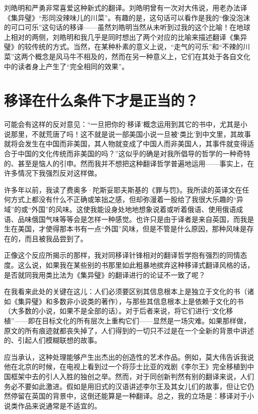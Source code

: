 刘皓明和严勇非常喜爱这种新式的翻译。刘皓明曾有一次对大伟说，用老办法译《集异璧》“形同没辣味儿的川菜”。有趣的是，这句话可以看作是我的“像没泡沫的可口可乐”这句话的移译——虽然刘皓明当然从未听到过我的这个比喻！在地球上相对的两侧，刘皓明和我几乎是同时想出了两个对应的比喻来描述翻译《集异璧》的较传统的方式。当然，在某种朴素的意义上说，“走气的可乐”和“不辣的川菜”这两个概念是风马牛不相及的，然而在另一种意义上，它们在其处于各自文化中的读者身上产生了“完全相同的效果”。

\section*{移译在什么条件下才是正当的？}

可能会有这样的反对意见：“一旦把你的‘移译’概念运用到其它的书中，尤其是小说那里，不就荒唐了吗！这不就是说一部美国小说一旦被‘类比’到中文里，其故事就将会发生在中国而非美国，其人物就变成了中国人而非美国人，其事件就变得适合于中国的文化传统而非美国的吗？”这似乎的确是对我所倡导的哲学的一种奇特的、甚至是恼人的引申。然而我并不想把这种翻译哲学普遍地运用——事实上，在许多情况下我强烈反对这样做。

许多年以前，我读了费奥多·陀斯妥耶夫斯基的《罪与罚》。我所读的英译文在任何方式上都没有什么不正确或笨拙之感，但却弥漫着一股给了我很大乐趣的“异域”的或“外国”的风味。这使我能设身处地地想象说着或听着俄语、使用俄语成语、品味俄国气味等等会是怎样一种感觉。也许只是由于译者是来自英国，而我是生在美国，才使得那本书有一点“外国”风味，但是不管是什么原因，那种风味是存在的，而且被我品尝到了。

正像这个反应所揭示的那样，我对同移译针锋相对的翻译哲学抱有强烈的同情态度。这么说，如果我在某些别的书那里如此粗暴地摈弃这种移译式翻译风格的话，是否就同我用类比法为《集异璧》的翻译进行的论证不一致了呢？

在我看来此处的关键在这儿：人们必须要区别其信息根本上是独立于文化的书（诸如《集异璧》和多数非小说类的著作），与那些其信息根本上是依赖于文化的书（大多数的小说，如果不是全部的话）。对于后者来说，将它们进行“文化移植”——即在目标文化的所有层次上重构它们——显然是一场灾难。如果那样做，原文的所有痕迹就都丧失掉了，人们得到的一切只不过是在一个全新的背景中讲述的、引起人们模糊联想的故事。

应当承认，这种处理能够产生出杰出的创造性的艺术作品。例如，莫大伟告诉我说他在北京的时候，在电视上看到过一个将莎士比亚的戏剧《李尔王》完全移植到中国框架中去的引人入胜的独创之举。然而，对于同创新判然有别的翻译来说，人们务必不要如此激进。假如是用旧式的汉语讲述李尔王及其女儿们的故事，但让它仍然停留在英国的背景中，这倒还能算是一种翻译。总之，我的立场是：移译对于小说类作品来说通常是不适宜的。

